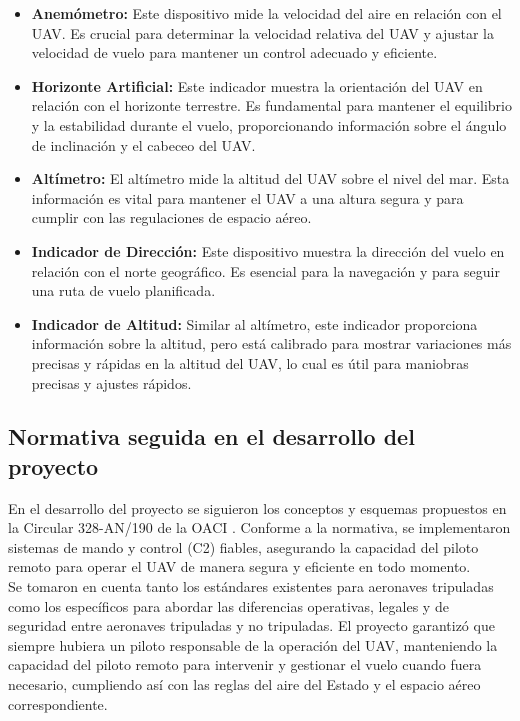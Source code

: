 \begin{itemize}
  \item \textbf{Anemómetro:} Este dispositivo mide la velocidad del aire en relación con el UAV. Es crucial para determinar la velocidad relativa del UAV y ajustar la velocidad de vuelo para mantener un control adecuado y eficiente.\\

  \item \textbf{Horizonte Artificial:} Este indicador muestra la orientación del UAV en relación con el horizonte terrestre. Es fundamental para mantener el equilibrio y la estabilidad durante el vuelo, proporcionando información sobre el ángulo de inclinación y el cabeceo del UAV.\\

  \item \textbf{Altímetro:} El altímetro mide la altitud del UAV sobre el nivel del mar. Esta información es vital para mantener el UAV a una altura segura y para cumplir con las regulaciones de espacio aéreo.\\

  \item \textbf{Indicador de Dirección:} Este dispositivo muestra la dirección del vuelo en relación con el norte geográfico. Es esencial para la navegación y para seguir una ruta de vuelo planificada.\\

  \item \textbf{Indicador de Altitud:} Similar al altímetro, este indicador proporciona información sobre la altitud, pero está calibrado para mostrar variaciones más precisas y rápidas en la altitud del UAV, lo cual es útil para maniobras precisas y ajustes rápidos.\\
\end{itemize}

\subsection{Normativa seguida en el desarrollo del proyecto}

En el desarrollo del proyecto se siguieron los conceptos y esquemas propuestos en la Circular 328-AN/190 de la OACI \cite{circular_aerea}. Conforme a la normativa, se implementaron sistemas de mando y control (C2) fiables, asegurando la capacidad del piloto remoto para operar el UAV de manera segura y eficiente en todo momento.\\

Se tomaron en cuenta tanto los estándares existentes para aeronaves tripuladas como los específicos para abordar las diferencias operativas, legales y de seguridad entre aeronaves tripuladas y no tripuladas. El proyecto garantizó que siempre hubiera un piloto responsable de la operación del UAV, manteniendo la capacidad del piloto remoto para intervenir y gestionar el vuelo cuando fuera necesario, cumpliendo así con las reglas del aire del Estado y el espacio aéreo correspondiente.\\

